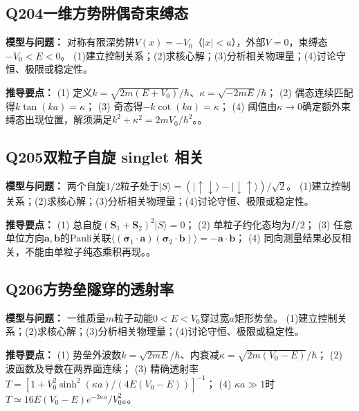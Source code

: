 \par\medskip

\subsection*{Q204\quad 一维方势阱偶奇束缚态}

\textbf{模型与问题：} 对称有限深势阱$V(x)=-V_0$（$|x|<a$），外部$V=0$，束缚态$-V_0<E<0$。 (1)建立控制关系；(2)求核心解；(3)分析相关物理量；(4)讨论守恒、极限或稳定性。

\par\textbf{推导要点：} (1) 定义$k=\sqrt{2m(E+V_0)}/\hbar$、$\kappa=\sqrt{-2mE}/\hbar$； (2) 偶态连续匹配得$k\tan(ka)=\kappa$； (3) 奇态得$-k\cot(ka)=\kappa$； (4) 阈值由$\kappa\to0$确定额外束缚态出现位置，解须满足$k^2+\kappa^2=2mV_0/\hbar^2$。。

\par\medskip

\subsection*{Q205\quad 双粒子自旋 singlet 相关}

\textbf{模型与问题：} 两个自旋$1/2$粒子处于$|S\rangle=(|\uparrow\downarrow\rangle-|\downarrow\uparrow\rangle)/\sqrt2$。 (1)建立控制关系；(2)求核心解；(3)分析相关物理量；(4)讨论守恒、极限或稳定性。

\par\textbf{推导要点：} (1) 总自旋$(\mathbf S_1+\mathbf S_2)^2|S\rangle=0$； (2) 单粒子约化态均为$I/2$； (3) 任意单位方向$\mathbf a,\mathbf b$的Pauli关联$\langle(\boldsymbol\sigma_1\cdot\mathbf a)(\boldsymbol\sigma_2\cdot\mathbf b)\rangle=-\mathbf a\cdot\mathbf b$； (4) 同向测量结果必反相关，不能由单粒子纯态乘积再现。。

\par\medskip

\subsection*{Q206\quad 方势垒隧穿的透射率}

\textbf{模型与问题：} 一维质量$m$粒子动能$0<E<V_0$穿过宽$a$矩形势垒。 (1)建立控制关系；(2)求核心解；(3)分析相关物理量；(4)讨论守恒、极限或稳定性。

\par\textbf{推导要点：} (1) 势垒外波数$k=\sqrt{2mE}/\hbar$、内衰减$\kappa=\sqrt{2m(V_0-E)}/\hbar$； (2) 波函数及导数在两界面连续； (3) 精确透射率$T=[1+V_0^2\sinh^2(\kappa a)/(4E(V_0-E))]^{-1}$； (4) $\kappa a\gg1$时$T\simeq16E(V_0-E)e^{-2\kappa a}/V_0^2$。。

